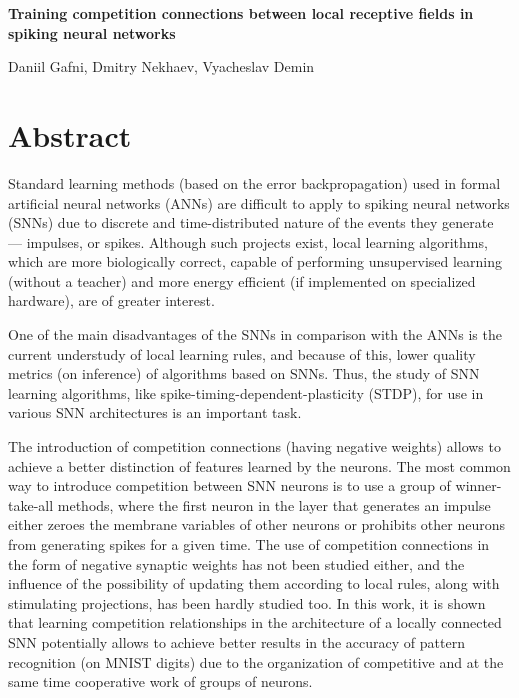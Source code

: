 \documentclass[a4paper]{article}
\begin{document}
\thispagestyle{empty}

\begin{center}
    \large\textbf{Training competition connections between local receptive fields in spiking neural networks}\\
    \hfill\break
    
    Daniil Gafni, Dmitry Nekhaev, Vyacheslav Demin
\end{center}





\section*{Abstract}
Standard learning methods (based on the error backpropagation) used in formal artificial neural networks (ANNs) are difficult to apply to spiking neural networks (SNNs) due to discrete and time-distributed nature of the events they generate --- impulses, or spikes. Although such projects exist, local learning algorithms, which are more biologically correct, capable of performing unsupervised learning (without a teacher) and more energy efficient (if implemented on specialized hardware), are of greater interest.

One of the main disadvantages of the SNNs in comparison with the ANNs is the current understudy of local learning rules, and because of this, lower quality metrics (on inference) of algorithms based on SNNs. Thus, the study of SNN learning algorithms, like spike-timing-dependent-plasticity (STDP), for use in various SNN architectures is an important task.

The introduction of competition connections (having negative weights) allows to achieve a better distinction of features learned by the neurons. The most common way to introduce competition between SNN neurons is to use a group of winner-take-all methods, where the first neuron in the layer that generates an impulse either zeroes the membrane variables of other neurons or prohibits other neurons from generating spikes for a given time. The use of competition connections in the form of negative synaptic weights has not been studied either, and the influence of the possibility of updating them according to local rules, along with stimulating projections, has been hardly studied too. In this work, it is shown that learning competition relationships in the architecture of a locally connected SNN potentially allows to achieve better results in the accuracy of pattern recognition (on MNIST digits) due to the organization of competitive and at the same time cooperative work of groups of neurons.
\end{document}
